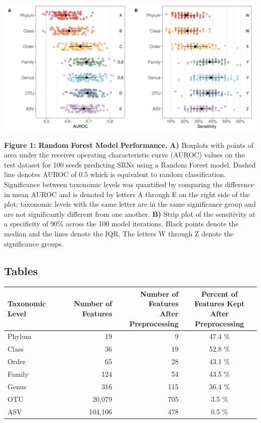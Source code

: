 \documentclass[
]{article}
\begin{document}
\includegraphics{figure_1.png}

\textbf{Figure 1: Random Forest Model Performance.} \textbf{A)} Boxplots
with points of area under the receiver operating characteristic curve
(AUROC) values on the test dataset for 100 seeds predicting SRNs using a
Random Forest model. Dashed line denotes AUROC of 0.5 which is
equivalent to random classification. Significance between taxonomic
levels was quantified by comparing the difference in mean AUROC and is
denoted by letters A through E on the right side of the plot; taxonomic
levels with the same letter are in the same significance group and are
not significantly different from one another. \textbf{B)} Strip plot of
the sensitivity at a specificity of 90\% across the 100 model
iterations. Black points denote the median and the lines denote the IQR.
The letters W through Z denote the significance groups.

\newpage

\hypertarget{tables}{%
\subsection{Tables}\label{tables}}

\begin{longtable}[]{@{}lrrc@{}}
\toprule
Taxonomic Level & Number of Features &
\makecell[c]{Number of Features \\ After Preprocessing} &
\makecell[c]{Percent of Features Kept \\ After Preprocessing} \\
\midrule
\endhead
Phylum & 19 & 9 & 47.4 \% \\
Class & 36 & 19 & 52.8 \% \\
Order & 65 & 28 & 43.1 \% \\
Family & 124 & 54 & 43.5 \% \\
Genus & 316 & 115 & 36.4 \% \\
OTU & 20,079 & 705 & 3.5 \% \\
ASV & 104,106 & 478 & 0.5 \% \\
\bottomrule
\end{longtable}
\end{document}
